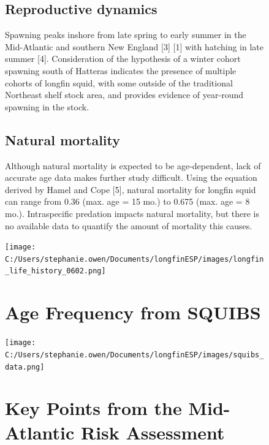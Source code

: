 \documentclass[
  9pt,
  letterpaper,
  DIV=11,
  numbers=noendperiod]{scrartcl}
\begin{document}
\begin{figure}
\begin{minipage}{0.57\linewidth}
\vspace{0.25cm}

\subsection{Reproductive dynamics}

Spawning peaks inshore from late spring to early summer in the
Mid-Atlantic and southern New England {[}3{]} {[}1{]} with hatching in
late summer {[}4{]}. Consideration of the hypothesis of a winter cohort
spawning south of Hatteras indicates the presence of multiple cohorts of
longfin squid, with some outside of the traditional Northeast shelf
stock area, and provides evidence of year-round spawning in the stock.

\vspace{0.25cm}

\subsection{Natural mortality}

Although natural mortality is expected to be age-dependent, lack of
accurate age data makes further study difficult. Using the equation
derived by Hamel and Cope {[}5{]}, natural mortality for longfin squid
can range from 0.36 (max. age = 15 mo.) to 0.675 (max. age = 8 mo.).
Intraspecific predation impacts natural mortality, but there is no
available data to quantify the amount of mortality this causes.

\texttt{[image: C:/Users/stephanie.owen/Documents/longfinESP/images/longfin\_life\_history\_0602.png]}

\end{minipage}%
%
\begin{minipage}{0.03\linewidth}

\hfill

\end{minipage}%
%
\begin{minipage}{0.40\linewidth}

\vspace{0.50cm}
\section{Age Frequency from SQUIBS}

\texttt{[image: C:/Users/stephanie.owen/Documents/longfinESP/images/squibs\_data.png]}

\section{Key Points from the Mid-Atlantic Risk Assessment}


\end{minipage}
\end{figure}
\end{document}

